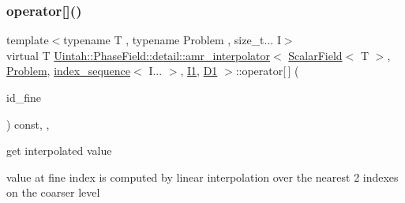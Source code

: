 \mbox{\label{classUintah_1_1PhaseField_1_1detail_1_1amr__interpolator_3_01ScalarField_3_01T_01_4_00_01Problem71844444bc14a03c0566689b6b502040_a94e3434279f44322dd2fe65f16a15613}} 
\subsubsection{\texorpdfstring{operator[]()}{operator[]()}\hspace{0.1cm}{\footnotesize\ttfamily [2/2]}}
{\footnotesize\ttfamily template$<$typename T , typename Problem , size\+\_\+t... I$>$ \\
virtual T \hyperlink{classUintah_1_1PhaseField_1_1detail_1_1amr__interpolator}{Uintah\+::\+Phase\+Field\+::detail\+::amr\+\_\+interpolator}$<$ \hyperlink{structUintah_1_1PhaseField_1_1ScalarField}{Scalar\+Field}$<$ T $>$, \hyperlink{classUintah_1_1PhaseField_1_1Problem}{Problem}, \hyperlink{namespaceUintah_1_1PhaseField_a237de804d99512e50613aff7c94a9461}{index\+\_\+sequence}$<$ I... $>$, \hyperlink{namespaceUintah_1_1PhaseField_a547ce3002aa97fbd3ef3192a6eec8406a66f19efe774b0d2b6e5844eb2d83d305}{I1}, \hyperlink{namespaceUintah_1_1PhaseField_a12bfc68444894dffdf0cb8d9cf0cc76aa24dcc0ba6bcb45bc6f503b1b538c6809}{D1} $>$\+::operator\mbox{[}$\,$\mbox{]} (\begin{DoxyParamCaption}\item[{const Int\+Vector \&}]{id\+\_\+fine }\end{DoxyParamCaption}) const\hspace{0.3cm}{\ttfamily [inline]}, {\ttfamily [override]}, {\ttfamily [virtual]}}



get interpolated value 

value at fine index is computed by linear interpolation over the nearest 2 indexes on the coarser level


